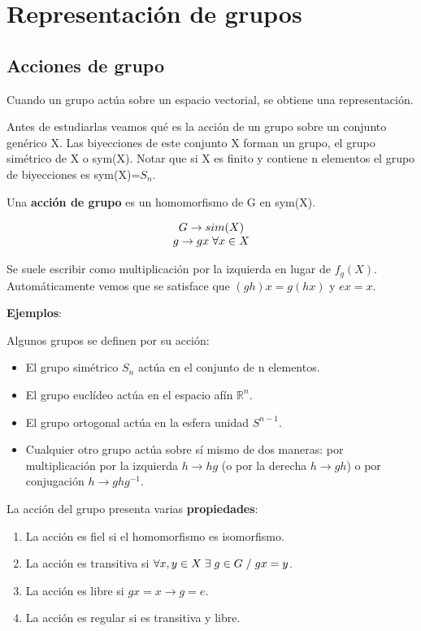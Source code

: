 
\section{Representación de grupos}
\subsection{Acciones de grupo}
Cuando un grupo actúa sobre un espacio vectorial, se obtiene una representación.

Antes de estudiarlas veamos qué es la acción de un grupo sobre un conjunto genérico X. Las biyecciones de este conjunto X forman un grupo, el grupo simétrico de X o sym(X). Notar que si X es finito y contiene n elementos el grupo de biyecciones es sym(X)=$S_n$.

\smallskip
Una \textbf{acción de grupo} es un homomorfismo de G en sym(X).

$$\begin{array}{c}
G \to sim(X)  \\
g\to gx \hspace{0.1cm} \forall x\in X
\end{array}$$

Se suele escribir como multiplicación por la izquierda en lugar de $f_g(X)$. Automáticamente vemos que se satisface que $(gh)x=g(hx)$ y $ex=x$.

\smallskip
\textbf{Ejemplos}:

\smallskip
Algunos grupos se definen por su acción:

\begin{itemize}
\item El grupo simétrico $S_n$ actúa en el conjunto de n elementos.
\item El grupo euclídeo actúa en el espacio afín $\mathds{R}^n$.
\item El grupo ortogonal actúa en la esfera unidad $S^{n-1}$.
\item Cualquier otro grupo actúa sobre sí mismo de dos maneras: por multiplicación por la izquierda $h\to hg$ (o por la derecha $h \to gh$) o por conjugación $h \to ghg^{-1}$.
\end{itemize}

La acción del grupo presenta varias \textbf{propiedades}:

\begin{enumerate}
\item La acción es fiel si el homomorfismo es isomorfismo.
\item La acción es transitiva si $\forall x,y\in X \hspace{0.1cm}\exists \hspace{0.1cm} g\in G \hspace{0.1cm}/ \hspace{0.1cm} gx=y$.
\item La acción es libre si $gx=x \to g=e$.
\item La acción es regular si es transitiva y libre.
\end{enumerate}

